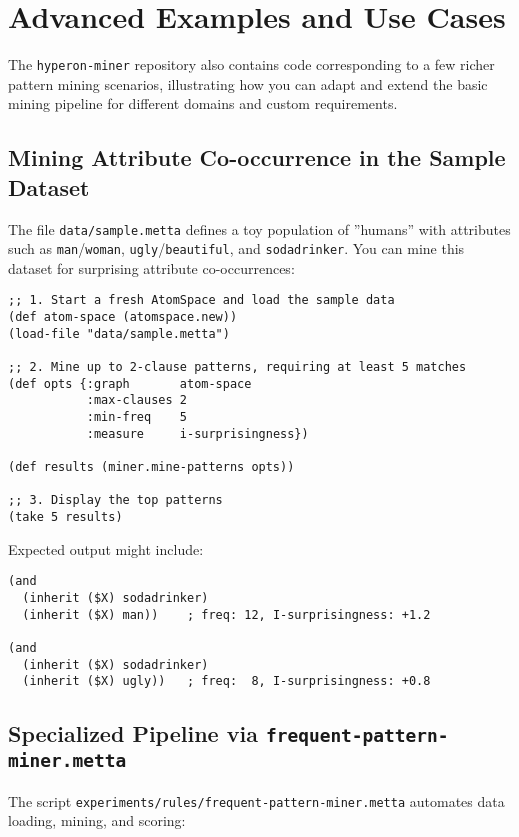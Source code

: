 \documentclass{article}
\begin{document}
\section{Advanced Examples and Use Cases}

The \texttt{hyperon-miner} repository also contains code corresponding to a few richer pattern mining scenarios, illustrating how you can adapt and extend the basic mining pipeline for different domains and custom requirements.

\subsection{Mining Attribute Co-occurrence in the Sample Dataset}

The file \texttt{data/sample.metta} defines a toy population of ''humans'' with attributes such as \texttt{man}/\texttt{woman}, \texttt{ugly}/\texttt{beautiful}, and \texttt{sodadrinker}.  You can mine this dataset for surprising attribute co-occurrences:

\begin{verbatim}
;; 1. Start a fresh AtomSpace and load the sample data
(def atom-space (atomspace.new))
(load-file "data/sample.metta")

;; 2. Mine up to 2-clause patterns, requiring at least 5 matches
(def opts {:graph       atom-space
           :max-clauses 2
           :min-freq    5
           :measure     i-surprisingness})

(def results (miner.mine-patterns opts))

;; 3. Display the top patterns
(take 5 results)
\end{verbatim}

Expected output might include:

\begin{verbatim}
(and 
  (inherit ($X) sodadrinker)
  (inherit ($X) man))    ; freq: 12, I-surprisingness: +1.2

(and 
  (inherit ($X) sodadrinker)
  (inherit ($X) ugly))   ; freq:  8, I-surprisingness: +0.8
\end{verbatim}

\subsection{Specialized Pipeline via \texttt{frequent-pattern-miner.metta}}

The script \texttt{experiments/rules/frequent-pattern-miner.metta} automates data loading, mining, and scoring:
\end{document}
